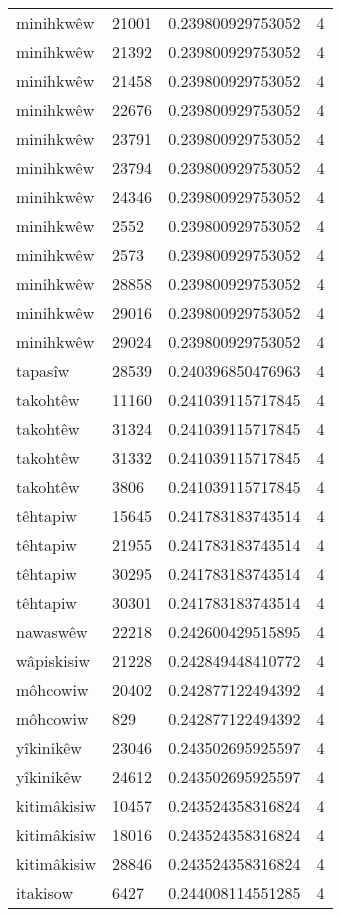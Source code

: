 \begin{longtable}{llll}
minihkwêw & 21001 & 0.239800929753052 & 4 \\
minihkwêw & 21392 & 0.239800929753052 & 4 \\
minihkwêw & 21458 & 0.239800929753052 & 4 \\
minihkwêw & 22676 & 0.239800929753052 & 4 \\
minihkwêw & 23791 & 0.239800929753052 & 4 \\
minihkwêw & 23794 & 0.239800929753052 & 4 \\
minihkwêw & 24346 & 0.239800929753052 & 4 \\
minihkwêw & 2552 & 0.239800929753052 & 4 \\
minihkwêw & 2573 & 0.239800929753052 & 4 \\
minihkwêw & 28858 & 0.239800929753052 & 4 \\
minihkwêw & 29016 & 0.239800929753052 & 4 \\
minihkwêw & 29024 & 0.239800929753052 & 4 \\
tapasîw & 28539 & 0.240396850476963 & 4 \\
takohtêw & 11160 & 0.241039115717845 & 4 \\
takohtêw & 31324 & 0.241039115717845 & 4 \\
takohtêw & 31332 & 0.241039115717845 & 4 \\
takohtêw & 3806 & 0.241039115717845 & 4 \\
têhtapiw & 15645 & 0.241783183743514 & 4 \\
têhtapiw & 21955 & 0.241783183743514 & 4 \\
têhtapiw & 30295 & 0.241783183743514 & 4 \\
têhtapiw & 30301 & 0.241783183743514 & 4 \\
nawaswêw & 22218 & 0.242600429515895 & 4 \\
wâpiskisiw & 21228 & 0.242849448410772 & 4 \\
môhcowiw & 20402 & 0.242877122494392 & 4 \\
môhcowiw & 829 & 0.242877122494392 & 4 \\
yîkinikêw & 23046 & 0.243502695925597 & 4 \\
yîkinikêw & 24612 & 0.243502695925597 & 4 \\
kitimâkisiw & 10457 & 0.243524358316824 & 4 \\
kitimâkisiw & 18016 & 0.243524358316824 & 4 \\
kitimâkisiw & 28846 & 0.243524358316824 & 4 \\
itakisow & 6427 & 0.244008114551285 & 4 \\

\end{longtable}
